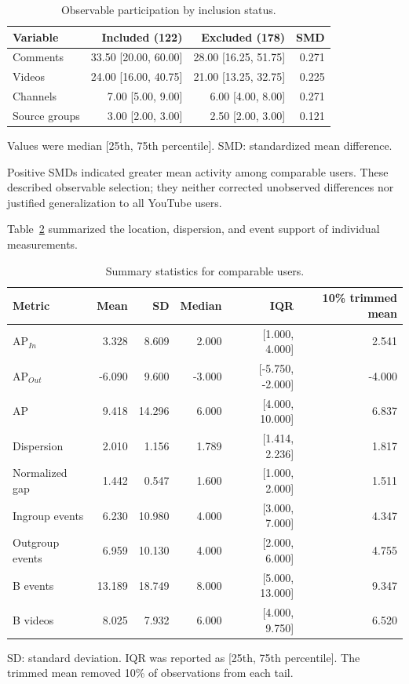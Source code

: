 \documentclass[11pt,a4paper]{article}
\begin{document}
\begin{table}[H]\centering\small
\caption{Observable participation by inclusion status.}
\label{tab:supp_selection}
\setlength{\tabcolsep}{4pt}
\begin{tabular}{lrrr}\toprule
Variable & Included (122) & Excluded (178) & SMD\\\midrule
Comments & 33.50 [20.00, 60.00] & 28.00 [16.25, 51.75] & 0.271\\
Videos & 24.00 [16.00, 40.75] & 21.00 [13.25, 32.75] & 0.225\\
Channels & 7.00 [5.00, 9.00] & 6.00 [4.00, 8.00] & 0.271\\
Source groups & 3.00 [2.00, 3.00] & 2.50 [2.00, 3.00] & 0.121\\
\bottomrule\end{tabular}
\par\smallskip\footnotesize Values were median [25th, 75th percentile]. SMD: standardized mean difference.
\end{table}

Positive SMDs indicated greater mean activity among comparable users. These described observable selection; they neither corrected unobserved differences nor justified generalization to all YouTube users.

Table~\ref{tab:supp_robust} summarized the location, dispersion, and event support of individual measurements.

\begin{table}[H]\centering\small
\caption{Summary statistics for comparable users.}
\label{tab:supp_robust}
\setlength{\tabcolsep}{4pt}
\begin{tabular}{lrrrrr}\toprule
Metric & Mean & SD & Median & IQR & 10\% trimmed mean\\\midrule
$\mathrm{AP}_{In}$ & 3.328 & 8.609 & 2.000 & [1.000, 4.000] & 2.541\\
$\mathrm{AP}_{Out}$ & -6.090 & 9.600 & -3.000 & [-5.750, -2.000] & -4.000\\
AP & 9.418 & 14.296 & 6.000 & [4.000, 10.000] & 6.837\\
Dispersion & 2.010 & 1.156 & 1.789 & [1.414, 2.236] & 1.817\\
Normalized gap & 1.442 & 0.547 & 1.600 & [1.000, 2.000] & 1.511\\
Ingroup events & 6.230 & 10.980 & 4.000 & [3.000, 7.000] & 4.347\\
Outgroup events & 6.959 & 10.130 & 4.000 & [2.000, 6.000] & 4.755\\
B events & 13.189 & 18.749 & 8.000 & [5.000, 13.000] & 9.347\\
B videos & 8.025 & 7.932 & 6.000 & [4.000, 9.750] & 6.520\\
\bottomrule\end{tabular}
\par\smallskip\footnotesize SD: standard deviation. IQR was reported as [25th, 75th percentile]. The trimmed mean removed 10\% of observations from each tail.
\end{table}
\end{document}
